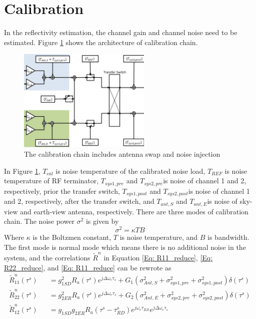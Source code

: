\documentclass[draftcls]{IEEEtran}
\begin{document}
\section{Calibration}
In the reflectivity estimation, the channel gain and channel noise need to be estimated. Figure \ref{fig:Hardware} shows the architecture of calibration chain.
\begin{figure}[t!]
	\centering
	\includegraphics[width=2.5in]{pdf/hardware.pdf}
	\caption{The calibration chain includes antenna swap and noise injection}
	\centering
	\label{fig:Hardware}
\end{figure}
In Figure \ref{fig:Hardware}, $T_{cal}$ is noise temperature of the calibrated noise load, $T_{REF}$ is noise temperature of RF terminator, $T_{sys1,pre}$ and $T_{sys2,pre}$is noise of channel 1 and 2, respectively, prior the transfer switch, $T_{sys1,post}$ and $T_{sys2,post}$is noise of channel 1 and 2, respectively, after the transfer switch, and $T_{ant,S}$ and $T_{ant,E}$is noise of sky-view and earth-view antenna, respectively. There are three modes of calibration chain. The noise power $\sigma^2$ is given by
\begin{equation}
	\sigma^2=\kappa TB
\end{equation}
Where $\kappa$ is the Boltzmen constant, $T$ is noise temperature, and $B$ is bandwidth. The first mode is normal mode which means there is no additional noise in the system, and the correlations $\tilde{R}^n$ in Equation \ref{Eq: R11_reduce}, \ref{Eq: R22_reduce}, and \ref{Eq: R11_reduce} can be rewrote as
\begin{eqnarray}
	\tilde{R}_{11}^n(\tau^s) &&= g^2_{1SD} R_a(\tau^s)e^{j\Delta\omega_e\tau_s}+
G_1(\sigma^2_{Ant,S}+\sigma^2_{sys1,pre} +\sigma^2_{sys1,post}) \delta(\tau^s)                                      
\label{Eq: R11_reduce_norm} \\
	\tilde{R}_{22}^n(\tau^s) &&= g^2_{2ER} R_a(\tau^s)e^{j\Delta\omega_e\tau_s}+
G_2(\sigma^2_{Ant,E}+\sigma^2_{sys2,pre} +\sigma^2_{sys2,post}) \delta(\tau^s)                                       
\label{Eq: R22_reduce_norm} \\
	\tilde{R}_{12}^n(\tau^s) &&= g_{1SD} g_{2ER} R_a(\tau^s-\tau^s_{RD})e^{j\omega_e \tau_{RD}} e^{j\Delta\omega_e\tau_s}  
\label{Eq: R12_reduce_norm}
\end{eqnarray}
\end{document}
